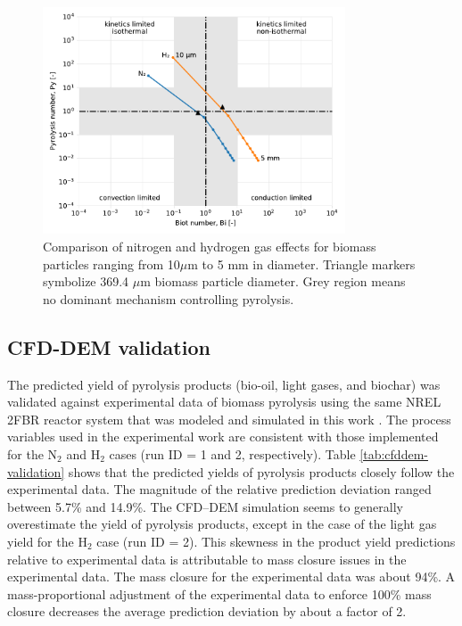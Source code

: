 \begin{figure}[H]
    \centering
    \includegraphics[width=0.8\textwidth]{figures/biot-pyro-diams.pdf}
    \caption{Comparison of nitrogen and hydrogen gas effects for biomass particles ranging from 10$\mu$m to 5 mm in diameter. Triangle markers symbolize 369.4 $\mu$m biomass particle diameter. Grey region means no dominant mechanism controlling pyrolysis.}
    \label{fig:biot-pyro-diams}
\end{figure}


\subsection{CFD-DEM validation}

The predicted yield of pyrolysis products (bio-oil, light gases, and biochar) was validated against experimental data of biomass pyrolysis using the same NREL 2FBR reactor system that was modeled and simulated in this work \cite{French-2021}. The process variables used in the experimental work are consistent with those implemented for the N$_2$ and H$_2$ cases (run ID = 1 and 2, respectively). Table \ref{tab:cfddem-validation} shows that the predicted yields of pyrolysis products closely follow the experimental data. The magnitude of the relative prediction deviation ranged between 5.7\% and 14.9\%. The CFD–DEM simulation seems to generally overestimate the yield of pyrolysis products, except in the case of the light gas yield for the H$_2$ case (run ID = 2). This skewness in the product yield predictions relative to experimental data is attributable to mass closure issues in the experimental data. The mass closure for the experimental data was about 94\%. A mass-proportional adjustment of the experimental data to enforce 100\% mass closure decreases the average prediction deviation by about a factor of 2.

